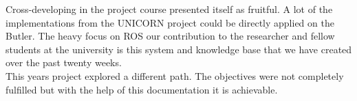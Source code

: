 \indent Cross-developing in the project course presented itself as fruitful. A lot of the implementations from the UNICORN project could be directly applied on the Butler. The heavy focus on ROS our contribution to the researcher and fellow students at the university is this system and knowledge base that we have created over the past twenty weeks.\\
\indent This years project explored a different path. The objectives were not completely fulfilled but with the help of this documentation it is achievable.








    
    









